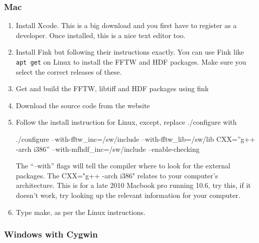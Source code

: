 \documentclass[]{nadia}
\begin{document}
\subsubsection{Mac}

\begin{enumerate}
\item Install Xcode. This is a big download and you first have
  to register as a developer. Once installed, this is a nice text
  editor too.
\item Install Fink\cite{fink} but following their instructions exactly.
  You can use Fink like {\tt apt get} on Linux to install the FFTW and
  HDF packages. Make sure you select the correct releases of these.
\item Get and build the FFTW, libtiff and HDF packages using fink
\item Download the \name source code from the website
\item Follow the install instruction for Linux, except, replace ./configure with 
\begin{myverbatim}
  ./configure --with-fftw_inc=/sw/include --with-fftw_lib=/sw/lib CXX=''g++ -arch i386'' --with-mfhdf_inc=/sw/include --enable-checking
\end{myverbatim}
The ``--with'' flags will tell the compiler where to look for the
external packages.  The CXX="g++ -arch i386" relates to your
computer's architecture. This is for a late 2010 Macbook pro running
10.6, try this, if it doesn't work, try looking up the relevant
information for your computer. %
\item Type make, as per the Linux instructions.
\end{enumerate}

\subsubsection{Windows with Cygwin}
\end{document}

